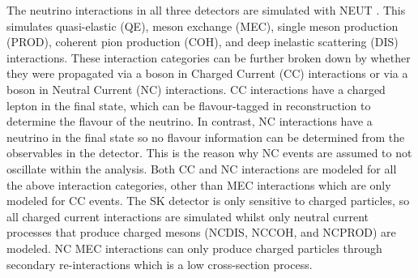 The neutrino interactions in all three detectors are simulated with NEUT \cite{Hayato2021, neut}. This simulates quasi-elastic (QE), meson exchange (MEC), single meson production (PROD), coherent pion production (COH), and deep inelastic scattering (DIS) interactions. These interaction categories can be further broken down by whether they were propagated via a  boson in Charged Current (CC) interactions or via a  boson in Neutral Current (NC) interactions. CC interactions have a charged lepton in the final state, which can be flavour-tagged in reconstruction to determine the flavour of the neutrino. In contrast, NC interactions have a neutrino in the final state so no flavour information can be determined from the observables in the detector. This is the reason why NC events are assumed to not oscillate within the analysis. Both CC and NC interactions are modeled for all the above interaction categories, other than MEC interactions which are only modeled for CC events. The SK detector is only sensitive to charged particles, so all charged current interactions are simulated whilst only neutral current processes that produce charged mesons (NCDIS, NCCOH, and NCPROD) are modeled. NC MEC interactions can only produce charged particles through secondary re-interactions which is a low cross-section process.

